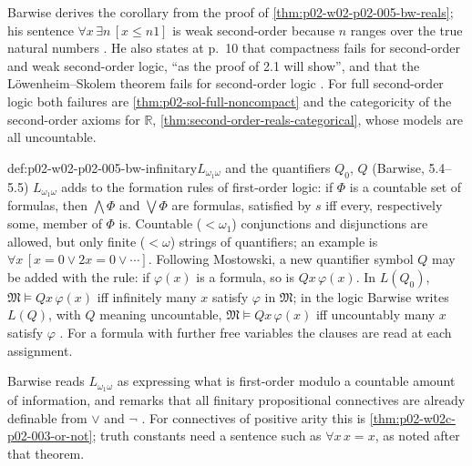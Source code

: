 Barwise derives the corollary from the proof of
\cref{thm:p02-w02-p02-005-bw-reals}; his sentence
\(\forall x\,\exists n\,[x\leq n1]\) is weak second-order because \(n\)
ranges over the true natural numbers \cite[ch.~A.1, \S2, p.~12]{Barwise1977FirstOrder}.
He also states at p.~10 that compactness fails for second-order and weak
second-order logic, ``as the proof of 2.1 will show'', and that the
L\"owenheim--Skolem theorem fails for second-order logic
\cite[ch.~A.1, \S2, p.~10]{Barwise1977FirstOrder}.  For full second-order
logic both failures are \cref{thm:p02-sol-full-noncompact} and the
categoricity of the second-order axioms for \(\mathbb R\),
\cref{thm:second-order-reals-categorical}, whose models are all
uncountable.

\begin{hbdefinition}{def:p02-w02-p02-005-bw-infinitary}{\(L_{\omega_1\omega}\) and the quantifiers \(Q_0\), \(Q\) (Barwise, 5.4--5.5)}
\(L_{\omega_1\omega}\) adds to the formation rules of first-order logic:
if \(\Phi\) is a countable set of formulas, then \(\bigwedge\Phi\) and
\(\bigvee\Phi\) are formulas, satisfied by \(s\) iff every, respectively
some, member of \(\Phi\) is.  Countable (\(<\omega_1\)) conjunctions and
disjunctions are allowed, but only finite (\(<\omega\)) strings of
quantifiers; an example is \(\forall x\,[x=0\lor2x=0\lor\cdots]\).
Following Mostowski, a new quantifier symbol \(Q\) may be added with the
rule: if \(\varphi(x)\) is a formula, so is \(Qx\,\varphi(x)\).  In
\(L(Q_0)\), \(\mathfrak M\models Qx\,\varphi(x)\) iff infinitely many \(x\)
satisfy \(\varphi\) in \(\mathfrak M\); in the logic Barwise writes
\(L(Q)\), with \(Q\) meaning uncountable, \(\mathfrak M\models Qx\,\varphi(x)\)
iff uncountably many \(x\) satisfy \(\varphi\)
\cite[ch.~A.1, \S5, pp.~43--45]{Barwise1977FirstOrder}.  For a formula
with further free variables the clauses are read at each assignment.
\end{hbdefinition}

Barwise reads \(L_{\omega_1\omega}\) as expressing what is first-order
modulo a countable amount of information, and remarks that all finitary
propositional connectives are already definable from \(\lor\) and \(\neg\)
\cite[ch.~A.1, \S5, p.~44]{Barwise1977FirstOrder}.  For connectives of
positive arity this is \cref{thm:p02-w02c-p02-003-or-not}; truth constants
need a sentence such as \(\forall x\,x=x\), as noted after that theorem.

